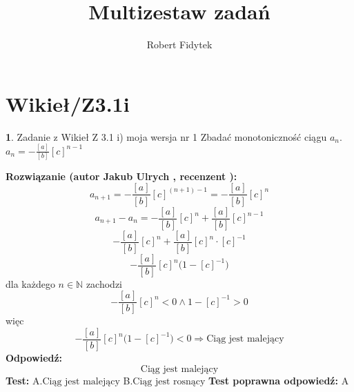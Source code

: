 \documentclass[12pt, a4paper]{article}
\title{Multizestaw zadań}
\author{Robert Fidytek}
\date{}
\theoremstyle{definition} %
\newtheorem{zad}{}
\newcommand{\kategoria}[1]{\section{#1}} %
\newcommand{\zadStart}[1]{\begin{zad}#1\newline} %
\newcommand{\zadStop}{\end{zad}}   %
\newcommand{\rozwStart}[2]{\noindent \textbf{Rozwiązanie (autor #1 , recenzent #2): }\newline} %
\newcommand{\rozwStop}{\newline}                                            %
\newcommand{\odpStart}{\noindent \textbf{Odpowiedź:}\newline}    %
\newcommand{\odpStop}{\newline}                                             %
\newcommand{\testStart}{\noindent \textbf{Test:}\newline} %
\newcommand{\testStop}{\newline} %
\newcommand{\kluczStart}{\noindent \textbf{Test poprawna odpowiedź:}\newline} %
\newcommand{\kluczStop}{\newline} %
\begin{document}
\maketitle


\kategoria{Wikieł/Z3.1i}
\zadStart{Zadanie z Wikieł Z 3.1 i) moja wersja nr 1}
Zbadać monotoniczność ciągu $a_{n}$.\\ $a_{n}=-\frac{[a]}{[b]}[c]^{n-1}$
\zadStop
\rozwStart{Jakub Ulrych}{}
$$a_{n+1}=-\frac{[a]}{[b]}[c]^{(n+1)-1}=-\frac{[a]}{[b]}[c]^{n}$$
$$a_{n+1}-a_{n}=-\frac{[a]}{[b]}[c]^{n}+\frac{[a]}{[b]}[c]^{n-1}$$
$$-\frac{[a]}{[b]}[c]^{n}+\frac{[a]}{[b]}[c]^{n}\cdot[c]^{-1}$$
$$-\frac{[a]}{[b]}[c]^{n}\big(1-[c]^{-1}\big)$$
dla każdego $n\in\mathbb{N}$ zachodzi
$$-\frac{[a]}{[b]}[c]^{n}<0\land 1-[c]^{-1}>0$$więc
$$-\frac{[a]}{[b]}[c]^{n}\big(1-[c]^{-1}\big)<0\Rightarrow \text{Ciąg jest malejący}$$
\rozwStop
\odpStart
$$\text{Ciąg jest malejący}$$
\odpStop
\testStart
A.$\text{Ciąg jest malejący}$
B.$\text{Ciąg jest rosnący}$
\testStop
\kluczStart
A
\kluczStop
\end{document}
